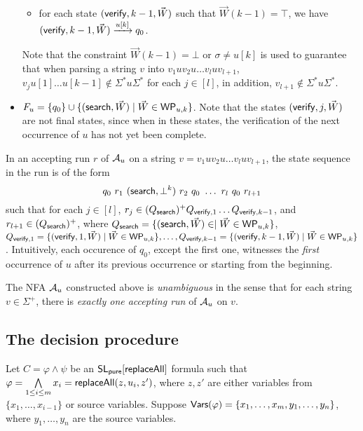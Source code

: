 \documentclass{llncs}
\begin{document}
\begin{itemize}
\begin{itemize}
%
\item for each state $(\mathsf{verify}, k-1, \vec{W})$ such that $\vec{W}(k-1)=\top$, we have $(\mathsf{verify}, k-1, \vec{W}) \xrightarrow{u[k]} q_0$.
%
\end{itemize}
Note that the constraint $\vec{W}(k-1) = \bot$ or $\sigma \neq u[k]$ is used to guarantee that when parsing a string $v$ into $v_1 u v_2 u \dots v_{l} u v_{l+1}$, $v_j u[1] \dots u[k-1] \not \in \Sigma^\ast u \Sigma^\ast$ for each $j \in [l]$, in addition, $v_{l+1} \not \in  \Sigma^\ast u \Sigma^\ast$.
%
\item $F_u=\{q_0\} \cup \{(\mathsf{search}, \vec{W}) \mid \vec{W} \in \mathsf{WP}_{u, k} \} $. Note that the states $(\mathsf{verify}, j, \vec{W})$ are not final states, since when in these states, the verification of the next occurrence of $u$ has not yet been complete.
\end{itemize}
In an accepting run $r$ of $\mathcal{A}_u$ on a string $v = v_1 u v_2 u \dots v_l u v_{l+1}$, the state sequence in the run is of the form 
$$q_0\ r_1\ (\search, \bot^k)\ r_2\ q_0\ \dots\ r_l\ q_0\ r_{l+1}$$ 
such that  for each $j \in [l]$, $r_j \in (Q_{\mathsf{search}})^+ Q_{\mathsf{verify}, 1}  \dots  Q_{\mathsf{verify}, k-1}$, and $r_{l+1} \in (Q_{\mathsf{search}})^+$, where $Q_{\mathsf{search}}  = \{(\mathsf{search}, \vec{W}) \in \mid \vec{W} \in \mathsf{WP}_{u,k}\}$, $Q_{\mathsf{verify}, 1} = \{(\mathsf{verify}, 1, \vec{W}) \mid \vec{W} \in \mathsf{WP}_{u,k}\}, \dots, Q_{\mathsf{verify}, k-1}=\{(\mathsf{verify}, k-1, \vec{W}) \mid \vec{W} \in \mathsf{WP}_{u, k}\}$. Intuitively, each occurence of $q_0$, except the first one, witnesses the \emph{first} occurrence of $u$ after its previous occurrence or starting from the beginning.

The NFA $\mathcal{A}_u$ constructed above is \emph{unambiguous} in the sense that for each string $v \in \Sigma^+$, there is \emph{exactly one accepting run} of $\mathcal{A}_u$ on $v$.


\subsection{The decision procedure}

Let $C= \varphi \wedge \psi$ be an $\mathsf{SL_{pure}}[\mathsf{replaceAll}]$ formula such that $\varphi = \bigwedge \limits_{1 \le i \le m} x_i = \mathsf{replaceAll}(z, u_i, z')$, where $z, z'$ are either variables from $\{x_1,\dots, x_{i-1}\}$ or source variables. Suppose $\mathsf{Vars}(\varphi) = \{x_1,\dots, x_m, y_1, \dots, y_n\}$, where $y_1,\dots, y_n$ are the source variables. 
\end{document}
